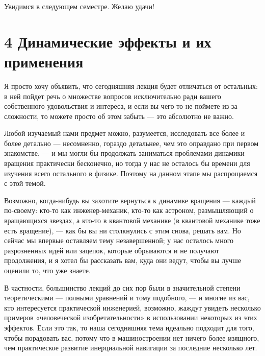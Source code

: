 \documentclass[11pt,oneside]{article}
\begin{document}
Увидимся в следующем семестре. Желаю удачи!\par

\clearpage

\section*{4 Динамические эффекты и их применения}


Я просто хочу объявить, что сегодняшняя лекция будет отличаться от остальных: в ней пойдет речь о множестве вопросов исключительно ради вашего собственного удовольствия и интереса, и если вы чего-то не поймете из-за сложности, то можете просто об этом забыть --- это абсолютно не важно.\par

Любой изучаемый нами предмет можно, разумеется, исследовать все более и более детально --- несомненно, гораздо детальнее, чем это оправдано при первом знакомстве, --- и мы могли бы продолжать заниматься проблемами динамики вращения практически бесконечно, но тогда у нас не осталось бы времени для изучения всего остального в физике. Поэтому на данном этапе мы распрощаемся с этой темой.\par

Возможно, когда-нибудь вы захотите вернуться к динамике вращения --- каждый по-своему: кто-то как инженер-механик, кто-то как астроном, размышляющий о вращающихся звездах, а кто-то в квантовой механике (в квантовой механике тоже есть вращение), --- как бы вы ни столкнулись с этим снова, решать вам. Но сейчас мы впервые оставляем тему незавершенной; у нас осталось много разрозненных идей или зацепок, которые обрываются и не получают продолжения, и я хотел бы рассказать вам, куда они ведут, чтобы вы лучше оценили то, что уже знаете.\par

В частности, большинство лекций до сих пор были в значительной степени теоретическими --- полными уравнений и тому подобного, --- и многие из вас, кто интересуется практической инженерией, возможно, жаждут увидеть несколько примеров «человеческой изобретательности» в использовании некоторых из этих эффектов. Если это так, то наша сегодняшняя тема идеально подходит для того, чтобы порадовать вас, потому что в машиностроении нет ничего более изящного, чем практическое развитие инерциальной навигации за последние несколько лет.\par
\end{document}
